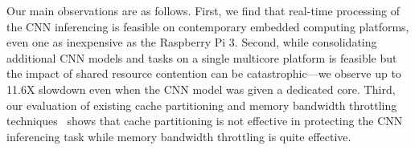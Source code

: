 %
%
%
%
%
%
Our main observations are as follows.
First, we find that real-time processing of the CNN inferencing is
feasible on contemporary embedded computing platforms, even one   
as inexpensive as the Raspberry Pi 3. Second, while consolidating
additional CNN models and tasks on a single multicore platform is
feasible but the impact of shared resource contention can be
catastrophic---we observe up to 11.6X slowdown even when the CNN model
was given a dedicated core.
Third, our evaluation of existing cache
partitioning and memory bandwidth throttling
techniques~\cite{yun2014rtas,Yun2013} shows that cache partitioning is
not effective in protecting the CNN inferencing task while memory
bandwidth throttling is quite effective.


